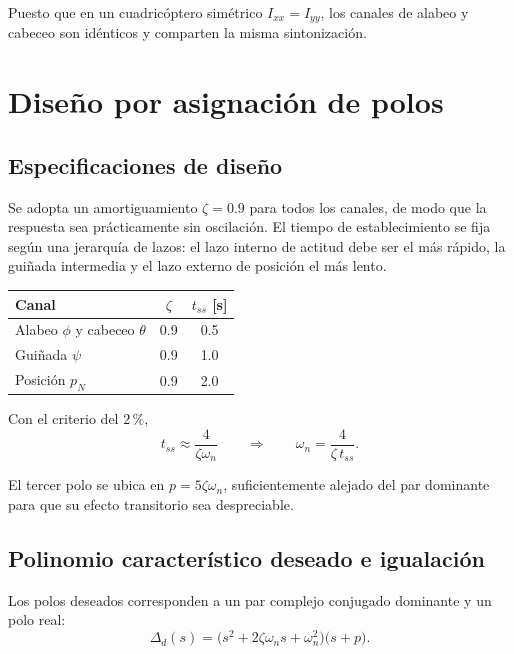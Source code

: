 \documentclass[11pt,a4paper]{article}
\begin{document}
Puesto que en un cuadricóptero simétrico $I_{xx}=I_{yy}$, los canales de alabeo
y cabeceo son idénticos y comparten la misma sintonización.

\section{Diseño por asignación de polos}

\subsection{Especificaciones de diseño}

Se adopta un amortiguamiento $\zeta=0.9$ para todos los canales, de modo que la
respuesta sea prácticamente sin oscilación. El tiempo de establecimiento se fija
según una jerarquía de lazos: el lazo interno de actitud debe ser el más rápido,
la guiñada intermedia y el lazo externo de posición el más lento.

\begin{center}
\begin{tabular}{lcc}
\toprule
Canal & $\zeta$ & $t_{ss}$ [s] \\
\midrule
Alabeo $\phi$ y cabeceo $\theta$ & 0.9 & 0.5 \\
Guiñada $\psi$                   & 0.9 & 1.0 \\
Posición $p_N$                   & 0.9 & 2.0 \\
\bottomrule
\end{tabular}
\end{center}

Con el criterio del $2\,\%$,
\begin{equation}
t_{ss}\approx\frac{4}{\zeta\omega_n}
\qquad\Longrightarrow\qquad
\omega_n=\frac{4}{\zeta\,t_{ss}} .
\label{eq:wn}
\end{equation}

El tercer polo se ubica en $p=5\zeta\omega_n$, suficientemente alejado del par
dominante para que su efecto transitorio sea despreciable.

\subsection{Polinomio característico deseado e igualación}

Los polos deseados corresponden a un par complejo conjugado dominante y un polo
real:
\begin{equation}
\Delta_d(s)=\big(s^{2}+2\zeta\omega_n s+\omega_n^{2}\big)\big(s+p\big).
\end{equation}
\end{document}

